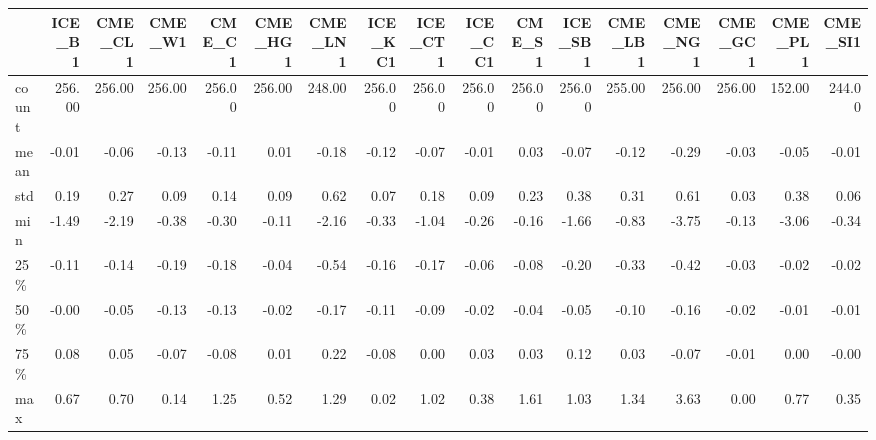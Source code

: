 \begin{tabular}{lrrrrrrrrrrrrrrrr}
\toprule
{} &  ICE\_B1 &  CME\_CL1 &  CME\_W1 &  CME\_C1 &  CME\_HG1 &  CME\_LN1 &  ICE\_KC1 &  ICE\_CT1 &  ICE\_CC1 &  CME\_S1 &  ICE\_SB1 &  CME\_LB1 &  CME\_NG1 &  CME\_GC1 &  CME\_PL1 &  CME\_SI1 \\
\midrule
count &  256.00 &   256.00 &  256.00 &  256.00 &   256.00 &   248.00 &   256.00 &   256.00 &   256.00 &  256.00 &   256.00 &   255.00 &   256.00 &   256.00 &   152.00 &   244.00 \\
mean  &   -0.01 &    -0.06 &   -0.13 &   -0.11 &     0.01 &    -0.18 &    -0.12 &    -0.07 &    -0.01 &    0.03 &    -0.07 &    -0.12 &    -0.29 &    -0.03 &    -0.05 &    -0.01 \\
std   &    0.19 &     0.27 &    0.09 &    0.14 &     0.09 &     0.62 &     0.07 &     0.18 &     0.09 &    0.23 &     0.38 &     0.31 &     0.61 &     0.03 &     0.38 &     0.06 \\
min   &   -1.49 &    -2.19 &   -0.38 &   -0.30 &    -0.11 &    -2.16 &    -0.33 &    -1.04 &    -0.26 &   -0.16 &    -1.66 &    -0.83 &    -3.75 &    -0.13 &    -3.06 &    -0.34 \\
25\%   &   -0.11 &    -0.14 &   -0.19 &   -0.18 &    -0.04 &    -0.54 &    -0.16 &    -0.17 &    -0.06 &   -0.08 &    -0.20 &    -0.33 &    -0.42 &    -0.03 &    -0.02 &    -0.02 \\
50\%   &   -0.00 &    -0.05 &   -0.13 &   -0.13 &    -0.02 &    -0.17 &    -0.11 &    -0.09 &    -0.02 &   -0.04 &    -0.05 &    -0.10 &    -0.16 &    -0.02 &    -0.01 &    -0.01 \\
75\%   &    0.08 &     0.05 &   -0.07 &   -0.08 &     0.01 &     0.22 &    -0.08 &     0.00 &     0.03 &    0.03 &     0.12 &     0.03 &    -0.07 &    -0.01 &     0.00 &    -0.00 \\
max   &    0.67 &     0.70 &    0.14 &    1.25 &     0.52 &     1.29 &     0.02 &     1.02 &     0.38 &    1.61 &     1.03 &     1.34 &     3.63 &     0.00 &     0.77 &     0.35 \\
\bottomrule
\end{tabular}
